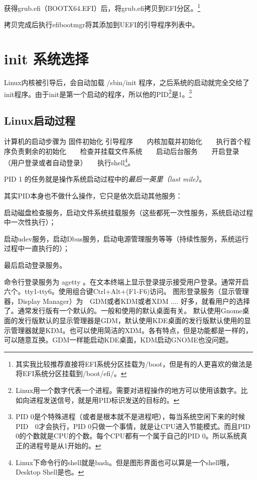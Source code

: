 \documentclass[amstex,twoside]{ctexbook}
\newenvironment{insertnote}{ \ttfamily\CJKfamily{KaiTi} }{\vskip 0.5cm }
\begin{document}
获得grub.efi（BOOTX64.EFI）后，将grub.efi拷贝到EFI分区。\footnote{其实我比较推荐直接将EFI系统分区挂载为/boot，但是有的人更喜欢的做法是将EFI系统分区挂载到/boot/efi/。}

拷贝完成后执行efibootmgr将其添加到UEFI的引导程序列表中。

\section{init 系统选择}

Linux内核被引导后，会自动加载 /sbin/init 程序，之后系统的启动就完全交给了init程序。由于init是第一个启动的程序，所以他的PID\footnote{Linux用一个数字代表一个进程。需要对进程操作的地方可以使用该数字。比如向进程发送信号，就是用PID标识发送的目标的。}是1。\footnote{PID 0是个特殊进程（或者是根本就不是进程吧），每当系统空闲下来的时候PID　0才会执行，PID 0只做一个事情，就是让CPU进入节能模式。而且PID　0的个数就是CPU的个数。每个CPU都有一个属于自己的PID 0。所以系统真正的进程号是从1开始的。}

\begin{insertnote}
\subsection*{Linux启动过程}
计算机的启动步骤为 固件初始化 \textrightarrow 引导程序　\textrightarrow　内核加载并初始化　\textrightarrow　执行首个程序负责剩余的初始化　\textrightarrow　检查并挂载文件系统　\textrightarrow　启动后台服务　\textrightarrow　开启登录　\textrightarrow　（用户登录或者自动登录）　\textrightarrow　执行shell\footnote{Linux下命令行的shell就是bash。但是图形界面也可以算是一个shell哦，Desktop Shell是也。}。

PID 1 的任务就是操作系统启动过程中的{\em 最后一英里（last mile）}。

其实PID本身也不做什么操作，它只是依次启动其他服务：

启动磁盘检查服务，启动文件系统挂载服务（这些都死一次性服务，系统启动过程中一次性执行）；

启动udev服务，启动Dbus服务，启动电源管理服务等等（持续性服务，系统运行过程中一直执行的）；

最后启动登录服务。

命令行登录服务为 agetty 。在文本终端上显示登录提示接受用户登录。通常开启六个。tty1-tty6。使用组合键Ctrl+Alt+(F1-F6)访问。
图形登录服务（显示管理器，Display Manager）为　GDM或者KDM或者XDM .... 好多，就看用户的选择了。通常发行版有一个默认的。一般和使用的默认桌面有关。
默认使用Gnome桌面的发行版默认的显示管理器是GDM，默认使用KDE桌面的发行版默认使用的显示管理器就是KDM。也可以使用简洁的XDM。各有特点，但是功能都是一样的，可以随意互换。GDM一样能启动KDE桌面，KDM启动GNOME也没问题。

\end{insertnote}
\end{document}
